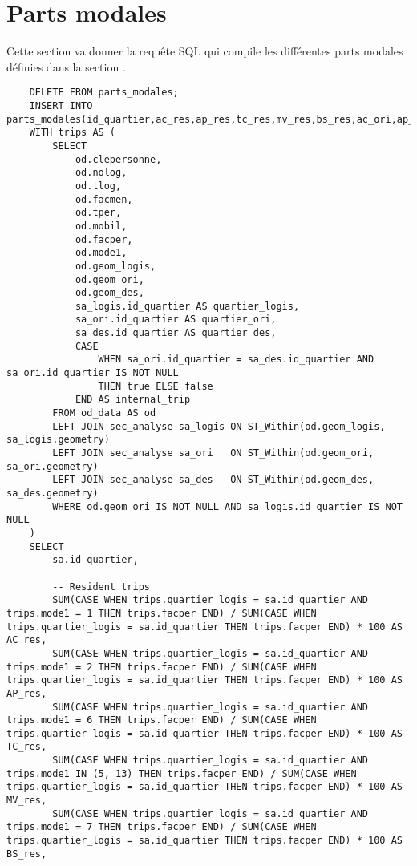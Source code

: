 \section{Parts modales}\label{sec:annexe_parts_modales}
Cette section va donner la requête SQL qui compile les différentes parts modales définies dans la section \label{sec:meth_analyse}. 
\begin{lstlisting}
    DELETE FROM parts_modales;
    INSERT INTO parts_modales(id_quartier,ac_res,ap_res,tc_res,mv_res,bs_res,ac_ori,ap_ori,tc_ori,mv_ori,bs_ori,ac_des,ap_des,tc_des,mv_des,bs_des,ac_int,ap_int,tc_int,mv_int,bs_int)
    WITH trips AS (
        SELECT
            od.clepersonne,
            od.nolog,
            od.tlog,
            od.facmen,
            od.tper,
            od.mobil,
            od.facper,
            od.mode1,
            od.geom_logis,
            od.geom_ori,
            od.geom_des,
            sa_logis.id_quartier AS quartier_logis,
            sa_ori.id_quartier AS quartier_ori,
            sa_des.id_quartier AS quartier_des,
            CASE 
                WHEN sa_ori.id_quartier = sa_des.id_quartier AND sa_ori.id_quartier IS NOT NULL 
                THEN true ELSE false 
            END AS internal_trip
        FROM od_data AS od
        LEFT JOIN sec_analyse sa_logis ON ST_Within(od.geom_logis, sa_logis.geometry)
        LEFT JOIN sec_analyse sa_ori   ON ST_Within(od.geom_ori, sa_ori.geometry)
        LEFT JOIN sec_analyse sa_des   ON ST_Within(od.geom_des, sa_des.geometry)
        WHERE od.geom_ori IS NOT NULL AND sa_logis.id_quartier IS NOT NULL
    )
    SELECT
        sa.id_quartier,

        -- Resident trips
        SUM(CASE WHEN trips.quartier_logis = sa.id_quartier AND trips.mode1 = 1 THEN trips.facper END) / SUM(CASE WHEN trips.quartier_logis = sa.id_quartier THEN trips.facper END) * 100 AS AC_res,
        SUM(CASE WHEN trips.quartier_logis = sa.id_quartier AND trips.mode1 = 2 THEN trips.facper END) / SUM(CASE WHEN trips.quartier_logis = sa.id_quartier THEN trips.facper END) * 100 AS AP_res,
        SUM(CASE WHEN trips.quartier_logis = sa.id_quartier AND trips.mode1 = 6 THEN trips.facper END) / SUM(CASE WHEN trips.quartier_logis = sa.id_quartier THEN trips.facper END) * 100 AS TC_res,
        SUM(CASE WHEN trips.quartier_logis = sa.id_quartier AND trips.mode1 IN (5, 13) THEN trips.facper END) / SUM(CASE WHEN trips.quartier_logis = sa.id_quartier THEN trips.facper END) * 100 AS MV_res,
        SUM(CASE WHEN trips.quartier_logis = sa.id_quartier AND trips.mode1 = 7 THEN trips.facper END) / SUM(CASE WHEN trips.quartier_logis = sa.id_quartier THEN trips.facper END) * 100 AS BS_res,


\end{lstlisting}
